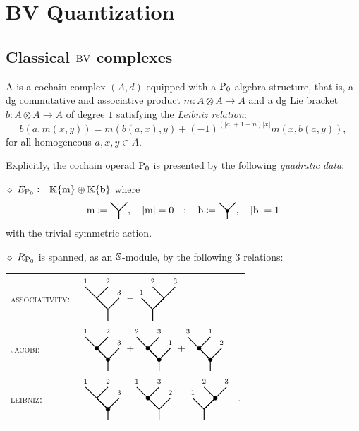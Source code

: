 
\section{BV Quantization}

\subsection{Classical \(\mathrm{BV}\) complexes}

A  is a cochain complex \((A,d)\) equipped with a \(\mathrm{P}_0\)-algebra structure, that is, a dg commutative and associative product  \(m \colon A \otimes A \to A\) and a dg Lie bracket \(b \colon A \otimes A \to A\) of degree \(1\) satisfying the \textit{Leibniz relation}:
\[
b(a, m(x,y)) = m(b(a,x), y) + (-1)^{(|a| + 1 - n)|x|} m(x, b(a,y)), 
\]
for all homogeneous \(a, x, y \in A\).

\medskip\noindent 
Explicitly, the cochain operad \(\mathrm{P}_0\) is presented by the following \textit{quadratic data}:

\medskip\noindent \(\diamond\) \(E_{\mathrm{P}_0} \coloneqq \mathbb{K}\{\mathrm{m}\} \oplus \mathbb{K}\{\mathrm{b}\}\) where
\[
\m \defeq \M, \quad |\m| = 0 \quad ; \quad \b \defeq \B, \quad |\b| = 1
\]
with the trivial symmetric action.

\medskip\noindent \(\diamond\) \(R_{\mathrm{P}_0}\) is spanned, as an \(\mathbb{S}\)-module, by the following 3 relations:

\begin{tabular}{ll}
	\textnormal{\textsc{associativity:}} & \(\LL{1}{2}{3} - \RR{1}{2}{3}\) \\
	\textnormal{\textsc{jacobi:}} & \(\BBB{1}{2}{3}+ \hspace*{-5pt} \BBB{2}{3}{1}+ \hspace*{-5pt} \BBB{3}{1}{2}\) \\
	\textnormal{\textsc{leibniz:}} & \(\LBM{1}{2}{3}- \hspace*{-5pt} \LMB{1}{3}{2}-\RMB{1}{2}{3}\)~.
\end{tabular}

